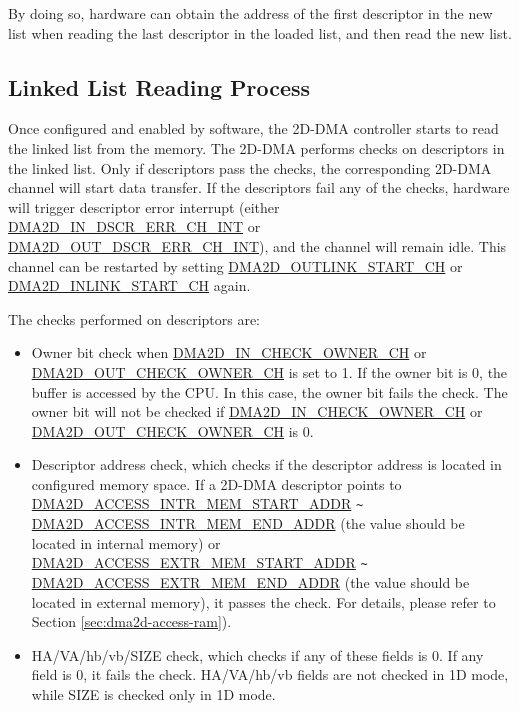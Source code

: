 \documentclass[main\_\_EN.tex]{subfiles}
\begin{document}
By doing so, hardware can obtain the address of the first descriptor in the new list when reading the last descriptor in the loaded list, and then read the new list.


\subsection{Linked List Reading Process}

Once configured and enabled by software, the 2D-DMA controller starts to read the linked list from the memory. The 2D-DMA performs checks on descriptors in the linked list. Only if descriptors pass the checks, the corresponding 2D-DMA channel will start data transfer. If the descriptors fail any of the checks, hardware will trigger descriptor error interrupt (either \hyperref[int:DMA2DINDSCRERRINT]{DMA2D\_IN\_DSCR\_ERR\_CH\_INT} or \hyperref[int:DMA2DOUTDSCRERRINT]{DMA2D\_OUT\_DSCR\_ERR\_CH\_INT}), and the channel will remain idle. This channel can be restarted by setting \hyperref[fielddesc:DMA2DOUTLINKSTARTCHN]{DMA2D\_OUTLINK\_START\_CH} or  \hyperref[fielddesc:DMA2DINLINKSTARTCHN]{DMA2D\_INLINK\_START\_CH} again.

The checks performed on descriptors are:
\begin{itemize}
    \item Owner bit check when \hyperref[fielddesc:DMA2DINCHECKOWNERCHN]{DMA2D\_IN\_CHECK\_OWNER\_CH} or \hyperref[fielddesc:DMA2DOUTCHECKOWNERCHN]{DMA2D\_OUT\_CHECK\_OWNER\_CH} is set to 1. If the owner bit is 0, the buffer is accessed by the CPU. In this case, the owner bit fails the check. The owner bit will not be checked if \hyperref[fielddesc:DMA2DINCHECKOWNERCHN]{DMA2D\_IN\_CHECK\_OWNER\_CH} or \hyperref[fielddesc:DMA2DOUTCHECKOWNERCHN]{DMA2D\_OUT\_CHECK\_OWNER\_CH} is 0.
    \item Descriptor address check, which checks if the descriptor address is located in configured memory space. If a 2D-DMA descriptor points to \hyperref[fielddesc:DMA2DACCESSINTRMEMSTARTADDR]{DMA2D\_ACCESS\_INTR\_MEM\_START\_ADDR} \verb+~+ \hyperref[fielddesc:DMA2DACCESSINTRMEMENDADDR]{DMA2D\_ACCESS\_INTR\_MEM\_END\_ADDR} (the value should be located in internal memory) or \hyperref[fielddesc:DMA2DACCESSEXTRMEMSTARTADDR]{DMA2D\_ACCESS\_EXTR\_MEM\_START\_ADDR} \verb+~+ \hyperref[fielddesc:DMA2DACCESSEXTRMEMENDADDR]{DMA2D\_ACCESS\_EXTR\_MEM\_END\_ADDR} (the value should be located in external memory), it passes the check. For details, please refer to Section \ref{sec:dma2d-access-ram}).
    \item HA/VA/hb/vb/SIZE check, which checks if any of these fields is 0. If any field is 0, it fails the check. HA/VA/hb/vb fields are not checked in 1D mode, while SIZE is checked only in 1D mode.
\end{itemize}
\end{document}
